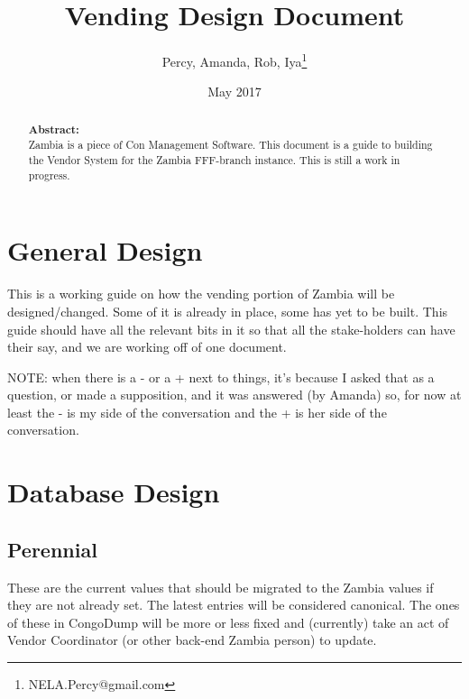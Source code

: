 \documentclass[captions=tablesignature]{scrartcl}
\author{Percy, Amanda, Rob, Iya\thanks{NELA.Percy@gmail.com}}
\date{May 2017}
\title{Vending Design Document}
\begin{document}
\maketitle
{}
\thispagestyle{fancy}
\renewcommand{\headrulewidth}{0pt}
\renewcommand{\footrulewidth}{0pt}
\lhead{}
\rhead{}
\chead{}
\lfoot{}
\cfoot{}
\rfoot{}
\begin{abstract}
\vspace{5cm}
{\LARGE{\textbf{Abstract:\\}}}
Zambia is a piece of Con Management Software.  This document is a guide to building the Vendor System for the Zambia FFF-branch instance.  This is still a work in progress.
\end{abstract}
\newpage
\renewcommand{\headrulewidth}{1pt}
\renewcommand{\footrulewidth}{1pt}
\rfoot{\thepage}
\setcounter{tocdepth}{2}
\tableofcontents
\listoftables
\listoffigures
\newpage
{}
\section{General Design}
\label{sec-1}
This is a working guide on how the vending portion of Zambia will be
designed/changed.  Some of it is already in place, some has yet to
be built.  This guide should have all the relevant bits in it so
that all the stake-holders can have their say, and we are working
off of one document.

NOTE: when there is a - or a + next to things, it's because I asked
that as a question, or made a supposition, and it was answered (by
Amanda) so, for now at least the - is my side of the conversation
and the + is her side of the conversation.

\section{Database Design}
\label{sec-2}
\subsection{Perennial}
\label{sec-2-1}
These are the current values that should be migrated to the Zambia
values if they are not already set.  The latest entries will be
considered canonical.  The ones of these in CongoDump will be more
or less fixed and (currently) take an act of Vendor Coordinator (or
other back-end Zambia person) to update.  
\end{document}
